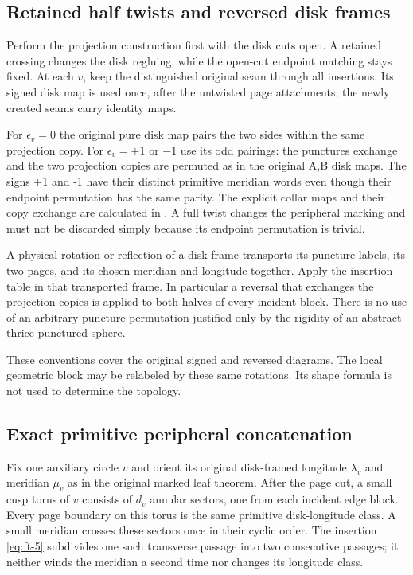 \subsection{Retained half twists and reversed disk frames}\label{sec:ft-5}

Perform the projection construction first with the disk cuts open.
A retained crossing changes the disk regluing, while the open-cut
endpoint matching stays fixed. At each \(v\), keep the distinguished
original seam through all insertions. Its signed disk map is used once,
after the untwisted page attachments; the newly created seams carry
identity maps.

For \(\epsilon_v=0\) the original pure disk map pairs the two sides within the same projection copy. For \(\epsilon_v=+1\) or \(-1\) use its odd pairings: the punctures exchange and the two projection copies are permuted as in the original A,B disk maps. The signs +1 and -1 have their distinct primitive meridian words even though their endpoint permutation has the same parity. The explicit collar maps and their copy exchange are calculated in
\cite[Section~3.2]{CircleTreeGeometry}. A full twist changes the peripheral marking and must not be discarded simply because its endpoint permutation is trivial.

A physical rotation or reflection of a disk frame transports its puncture labels, its two pages, and its chosen meridian and longitude together. Apply the insertion table in that transported frame. In particular a reversal that exchanges the projection copies is applied to both halves of every incident block. There is no use of an arbitrary puncture permutation justified only by the rigidity of an abstract thrice-punctured sphere.

These conventions cover the original signed and reversed diagrams. The local geometric block may be relabeled by these same rotations. Its shape formula is not used to determine the topology.

\subsection{Exact primitive peripheral concatenation}\label{sec:ft-6}

Fix one auxiliary circle \(v\) and orient its original disk-framed longitude \(\lambda_v\) and meridian \(\mu_v\) as in the original marked leaf theorem. After the page cut, a small cusp torus of \(v\) consists of \(d_v\) annular sectors, one from each incident edge block. Every page boundary on this torus is the same primitive disk-longitude class. A small meridian crosses these sectors once in their cyclic order. The insertion \eqref{eq:ft-5} subdivides one such transverse passage into two consecutive passages; it neither winds the meridian a second time nor changes its longitude class.

